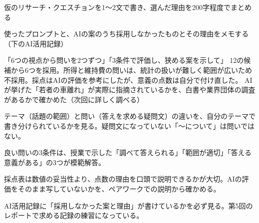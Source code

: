 \begin{nexttime}
  \item 仮のリサーチ・クエスチョンを1〜2文で書き、選んだ理由を200字程度でまとめる
  \item 使ったプロンプトと、AIの案のうち採用しなかったものとその理由をメモする（下のAI活用記録）
\end{nexttime}
{「6つの視点から問いを2つずつ」「3条件で評価し、狭める案を示して」}
{12の候補から6つを採用。所得と維持費の問いは、統計の扱いが難しく範囲が広いため不採用。採点はAIの評価を参考にしたが、意義の点数は自分で付け直した。}
{AIが挙げた「若者の車離れ」が実際に指摘されているかを、白書や業界団体の調査があるかで確かめた（次回に詳しく調べる）}

\begin{point}
  \item テーマ（話題の範囲）と問い（答えを求める疑問文）の違いを、自分のテーマで書き分けられているかを見る。疑問文になっていない「〜について」は問いではない。
  \item 良い問いの3条件は、授業で示した「調べて答えられる」「範囲が適切」「答える意義がある」の3つが模範解答。
  \item 採点表は数値の妥当性より、点数の理由を口頭で説明できるかが大切。AIの評価をそのまま写していないかを、ペアワークでの説明から確かめる。
  \item AI活用記録に「採用しなかった案と理由」が書けているかを必ず見る。第5回のレポートで求める記録の練習になっている。
\end{point}
